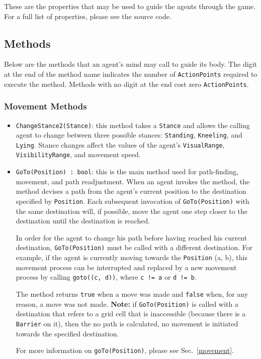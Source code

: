 \documentclass[
    a4paper,
    english,
    DIV=16,
    11pt,
    parskip=half,
    listof=totoc,		%
    index=totoc,		%
    bibliography=totoc,	%
]{scrartcl}
\begin{document}
These are the properties that may be used to guide the agents through the game. For a full list of properties, please see the source code.

\subsection{Methods} \label{methods}

Below are the methods that an agent's mind may call to guide its body. The digit at the end of the method name indicates the number of \texttt{ActionPoints} required to execute the method. Methods with no digit at the end cost zero \texttt{ActionPoints}.

\subsubsection{Movement Methods}

\begin{itemize}
    \item \texttt{ChangeStance2(Stance)}: this method takes a \texttt{Stance} and allows the calling agent to change between three possible stances: \texttt{Standing}, \texttt{Kneeling}, and \texttt{Lying}. Stance changes affect the values of the agent's \texttt{VisualRange}, \texttt{VisibilityRange}, and movement speed.
    \item \texttt{GoTo(Position) : bool}: this is the main method used for path-finding, movement, and path readjustment. When an agent invokes the method, the method devises a path from the agent's current position to the destination specified by \texttt{Position}. Each subsequent invocation of \texttt{GoTo(Position)} with the same destination will, if possible, move the agent one step closer to the destination until the destination is reached.
    \par
    In order for the agent to change his path before having reached his current destination, \texttt{GoTo(Position)} must be called with a different destination. For example, if the agent is currently moving towards the \texttt{Position} (a, b), this movement process can be interrupted and replaced by a new movement process by calling \texttt{goto((c, d))}, where \texttt{c != a} or \texttt{d != b}.
    \par
    The method returns \texttt{true} when a move was made and \texttt{false} when, for any reason, a move was not made. \textbf{Note:} if \texttt{GoTo(Position)} is called with a destination that refers to a grid cell that is inaccessible (because there is a \texttt{Barrier} on it), then the no path is calculated, no movement is initiated towards the specified destination.
    \par
    For more information on \texttt{goTo(Position)}, please see Sec.~\ref{movement}.
\end{itemize}
\end{document}
